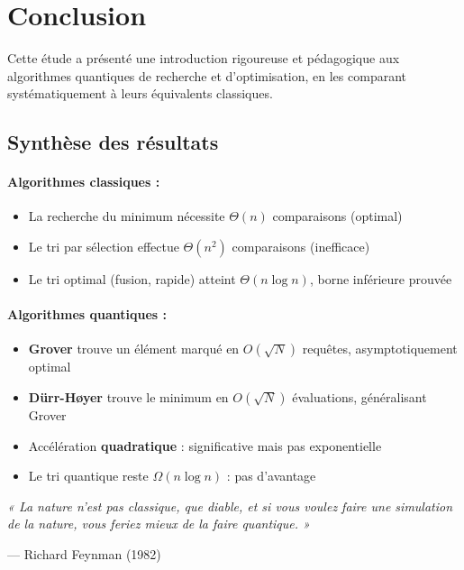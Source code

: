 \documentclass[12pt,a4paper]{article}
\theoremstyle{definition}
\theoremstyle{remark}
\begin{document}
\newpage

\section{Conclusion}

Cette étude a présenté une introduction rigoureuse et pédagogique aux algorithmes quantiques de recherche et d'optimisation, en les comparant systématiquement à leurs équivalents classiques.

\subsection{Synthèse des résultats}

\paragraph{Algorithmes classiques :}
\begin{itemize}
    \item La recherche du minimum nécessite $\Theta(n)$ comparaisons (optimal)
    \item Le tri par sélection effectue $\Theta(n^2)$ comparaisons (inefficace)
    \item Le tri optimal (fusion, rapide) atteint $\Theta(n \log n)$, borne inférieure prouvée
\end{itemize}

\paragraph{Algorithmes quantiques :}
\begin{itemize}
    \item \textbf{Grover} trouve un élément marqué en $O(\sqrt{N})$ requêtes, asymptotiquement optimal
    \item \textbf{Dürr-Høyer} trouve le minimum en $O(\sqrt{N})$ évaluations, généralisant Grover
    \item Accélération \textbf{quadratique} : significative mais pas exponentielle
    \item Le tri quantique reste $\Omega(n \log n)$ : pas d'avantage
\end{itemize}

\vfill

\begin{center}
\textit{« La nature n'est pas classique, que diable, et si vous voulez faire une simulation de la nature, vous feriez mieux de la faire quantique. »}

\medskip

--- Richard Feynman (1982)
\end{center}
\end{document}

